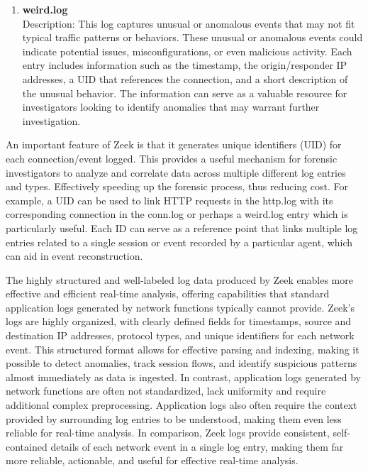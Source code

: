\documentclass[final,1p,times,authoryear]{elsarticle}
\begin{document}
\begin{enumerate}[label=(\alph*)]
    \item \textbf{weird.log} \\
    Description: This log captures unusual or anomalous events that may not fit typical traffic patterns or behaviors. These unusual or anomalous events could indicate potential issues, misconfigurations, or even malicious activity. Each entry includes information such as the timestamp, the origin/responder IP addresses, a UID that references the connection, and a short description of the unusual behavior. The information can serve as a valuable resource for investigators looking to identify anomalies that may warrant further investigation.

\end{enumerate}

An important feature of Zeek is that it generates unique identifiers (UID) for each connection/event logged. This provides a useful mechanism for forensic investigators to analyze and correlate data across multiple different log entries and types. Effectively speeding up the forensic process, thus reducing cost. For example, a UID can be used to link HTTP requests in the http.log with its corresponding connection in the conn.log or perhaps a weird.log entry which is particularly useful. Each ID can serve as a reference point that links multiple log entries related to a single session or event recorded by a particular agent, which can aid in event reconstruction.

\vspace{1em}

The highly structured and well-labeled log data produced by Zeek enables more effective and efficient real-time analysis, offering capabilities that standard application logs generated by network functions typically cannot provide. Zeek’s logs are highly organized, with clearly defined fields for timestamps, source and destination IP addresses, protocol types, and unique identifiers for each network event. This structured format allows for effective parsing and indexing, making it possible to detect anomalies, track session flows, and identify suspicious patterns almost immediately as data is ingested. In contrast, application logs generated by network functions are often not standardized, lack uniformity and require additional complex preprocessing. Application logs also often require the context provided by surrounding log entries to be understood, making them even less reliable for real-time analysis. In comparison, Zeek logs provide consistent, self-contained details of each network event in a single log entry, making them far more reliable, actionable, and useful for effective real-time analysis.
\end{document}
